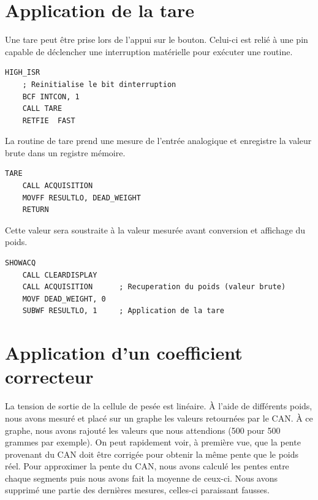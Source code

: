 \documentclass[a4paper,11pt,titlepage]{article}
\begin{document}
\section{Application de la tare}

Une tare peut être prise lors de l'appui sur le bouton. Celui-ci est relié à une pin capable de déclencher une interruption matérielle pour exécuter une routine.\\

\begin{lstlisting}
HIGH_ISR
    ; Reinitialise le bit dinterruption
    BCF INTCON, 1
    CALL TARE
    RETFIE  FAST
\end{lstlisting}

La routine de tare prend une mesure de l'entrée analogique et enregistre la valeur brute dans un registre mémoire.\\

\begin{lstlisting}
TARE
    CALL ACQUISITION
    MOVFF RESULTLO, DEAD_WEIGHT
    RETURN
\end{lstlisting}

Cette valeur sera soustraite à la valeur mesurée avant conversion et affichage du poids.\\

\begin{lstlisting}
SHOWACQ
    CALL CLEARDISPLAY
    CALL ACQUISITION      ; Recuperation du poids (valeur brute)
    MOVF DEAD_WEIGHT, 0   
    SUBWF RESULTLO, 1     ; Application de la tare
\end{lstlisting}

\section{Application d'un coefficient correcteur}

La tension de sortie de la cellule de pesée est linéaire. À l'aide de différents poids, nous avons mesuré et placé sur un graphe les valeurs retournées par le CAN. À ce graphe, nous avons rajouté les valeurs que nous attendions (500 pour 500 grammes par exemple). On peut rapidement voir, à première vue, que la pente provenant du CAN doit être corrigée pour obtenir la même pente que le poids réel. Pour approximer la pente du CAN, nous avons calculé les pentes entre chaque segments puis nous avons fait la moyenne de ceux-ci. Nous avons supprimé une partie des dernières mesures, celles-ci paraissant fausses.\\
\end{document}
